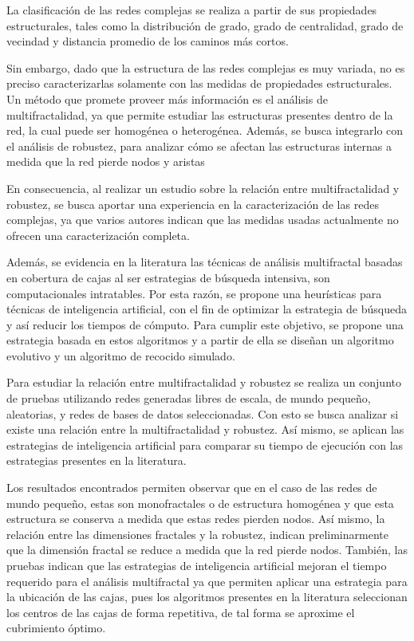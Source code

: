La clasificación de las redes complejas se realiza a partir de sus propiedades estructurales, tales como la distribución de grado, grado de centralidad, grado de vecindad y distancia promedio de los caminos más cortos. 

Sin embargo, dado que la estructura de las redes complejas es muy variada, no es preciso caracterizarlas solamente con las medidas de propiedades estructurales. Un método que promete proveer más información es el análisis de multifractalidad, ya que permite estudiar las estructuras presentes dentro de la red, la cual puede ser homogénea o heterogénea. Además, se busca integrarlo con el análisis de robustez, para analizar cómo se afectan las estructuras internas a medida que la red pierde nodos y aristas 

En consecuencia, al realizar un estudio sobre la relación entre multifractalidad y robustez, se busca aportar una experiencia en la caracterización de las redes complejas, ya que varios autores indican que las medidas usadas actualmente no ofrecen una caracterización completa.

Además, se evidencia en la literatura las técnicas de análisis multifractal basadas en cobertura de cajas al ser estrategias de búsqueda intensiva, son computacionales intratables. Por esta razón, se propone una heurísticas para técnicas de inteligencia artificial, con el fin de optimizar la estrategia de búsqueda y así reducir los tiempos de cómputo. Para cumplir este objetivo, se propone una estrategia basada en estos algoritmos y a partir de ella se diseñan un algoritmo evolutivo y un algoritmo de recocido simulado.

Para estudiar la relación entre multifractalidad y robustez se realiza un conjunto de pruebas utilizando redes generadas libres de escala, de mundo pequeño, aleatorias, y redes de bases de datos seleccionadas. Con esto se busca analizar si existe una relación entre la multifractalidad y robustez. Así mismo, se aplican las estrategias de inteligencia artificial para comparar su tiempo de ejecución con las estrategias presentes en la literatura.

Los resultados encontrados permiten observar que en el caso de las redes de mundo pequeño, estas son monofractales o de estructura homogénea y que esta estructura se conserva a medida que estas redes pierden nodos. Así mismo, la relación entre las dimensiones fractales y la robustez, indican preliminarmente que la dimensión fractal se reduce a medida que la red pierde nodos. También, las pruebas indican que las estrategias de inteligencia artificial mejoran el tiempo requerido para el análisis multifractal ya que permiten aplicar una estrategia para la ubicación de las cajas, pues los algoritmos presentes en la literatura seleccionan los centros de las cajas de forma repetitiva, de tal forma se aproxime el cubrimiento óptimo.


